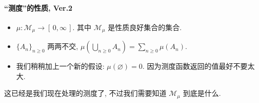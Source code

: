 \paragraph{``测度''的性质, Ver.2}\label{测度的性质}
\begin{itemize}
    \item $\mu :\mathcal M_\mu\to [\,0,\infty\,]$. 其中 $\mathcal M_\mu$ 是性质良好集合的集合.
    \item $\{A_n\}_{n\geqslant 0}$ 两两不交, $\mu (\bigcup_{n\geqslant 0} A_n) = \sum_{n\geqslant 0} \mu (A_n)$.
    \item 我们稍稍加上一个新的假设: $\mu (\varnothing) = 0$\enote. 因为测度函数返回的值最好不要太大.
\end{itemize}
这已经是我们现在处理的测度了, 不过我们需要知道 $\mathcal M_\mu$ 到底是什么.